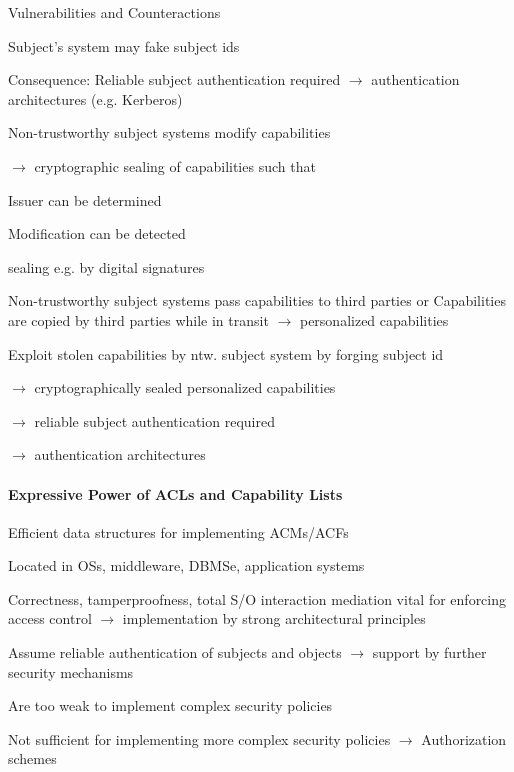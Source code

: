 \documentclass[a4paper]{article}
\begin{document}
\begin{multicols}{3}
    Vulnerabilities and Counteractions
    \begin{itemize*}
        \item Subject’s system may fake subject ids
        \item Consequence: Reliable subject authentication required $\rightarrow$ authentication architectures (e.g. Kerberos)
        \item Non-trustworthy subject systems modify capabilities
        \begin{itemize*}
            \item[$\rightarrow$] cryptographic sealing of capabilities such that
            \item Issuer can be determined
            \item Modification can be detected
            \item sealing e.g. by digital signatures
        \end{itemize*}
        \item Non-trustworthy subject systems pass capabilities to third parties or Capabilities are copied by third parties while in transit $\rightarrow$ personalized capabilities
        \item Exploit stolen capabilities by ntw. subject system by forging subject id
        \begin{itemize*}
            \item[$\rightarrow$] cryptographically sealed personalized capabilities
            \item[$\rightarrow$] reliable subject authentication required
            \item[$\rightarrow$] authentication architectures
        \end{itemize*}
    \end{itemize*}

    \paragraph{Expressive Power of ACLs and Capability Lists}
    \begin{itemize*}
        \item Efficient data structures for implementing ACMs/ACFs
        \item Located in OSs, middleware, DBMSe, application systems
        \item Correctness, tamperproofness, total S/O interaction mediation vital for enforcing access control $\rightarrow$ implementation by strong architectural principles
        \item Assume reliable authentication of subjects and objects $\rightarrow$ support by further security mechanisms
        \item Are too weak to implement complex security policies
        \item Not sufficient for implementing more complex security policies $\rightarrow$ Authorization schemes
    \end{itemize*}


\end{multicols}
\end{document}
